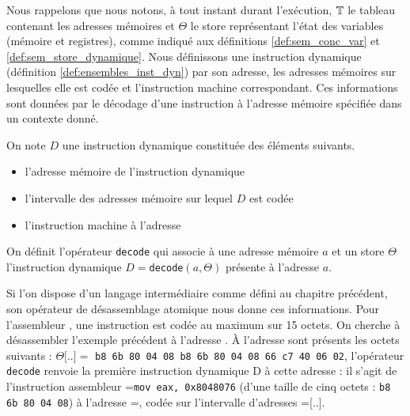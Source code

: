 Nous rappelons que nous notons, à tout instant durant l'exécution, $\mathbb T$ le tableau contenant les adresses mémoires et $\Theta$ le store représentant l'état des variables (mémoire et registres), comme indiqué aux définitions \ref{def:sem_conc_var} et \ref{def:sem_store_dynamique}.
Nous définissons une instruction dynamique (définition \ref{def:ensembles_inst_dyn}) par son adresse, les adresses mémoires sur lesquelles elle est codée et l'instruction machine correspondant. Ces informations sont données par le décodage d'une instruction à l'adresse mémoire spécifiée dans un contexte donné. 

\begin{defi}
On note $D$ une instruction dynamique constituée des éléments suivants.
\begin{itemize}
 \item {} l'adresse mémoire de l'instruction dynamique
 \item {} l'intervalle des adresses mémoire sur lequel $D$ est codée
 \item {} l'instruction machine à l'adresse 
\end{itemize}
On définit l'opérateur \texttt{decode} qui associe à une adresse mémoire $a$ et un store $\Theta$ l'instruction dynamique $D=$\texttt{decode}$(a, \Theta)$ présente à l'adresse $a$.
\label{def:ensembles_inst_dyn}
\end{defi}

Si l'on dispose d'un langage intermédiaire comme défini au chapitre précédent, son opérateur de désassemblage atomique nous donne ces informations. Pour l'assembleur \xq, une instruction est codée au maximum sur 15 octets.
On cherche à désassembler l'exemple précédent à l'adresse . À l'adresse  sont présents les octets suivants : $\Theta[$..$]=$ \texttt{b8 6b 80 04 08 b8 6b 80 04 08 66 c7 40 06 02}, l'opérateur \texttt{decode} renvoie la première instruction dynamique D à cette adresse : il s'agit de l'instruction assembleur =\texttt{mov eax, 0x8048076} (d'une taille de cinq octets : \texttt{b8 6b 80 04 08}) à l'adresse =, codée sur l'intervalle d'adresses =[..].

